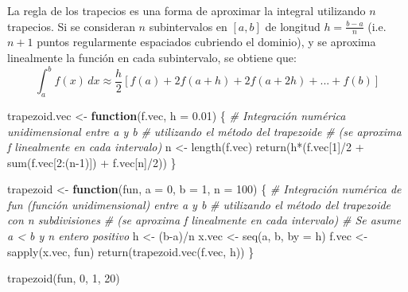 \documentclass[
]{book}
\newenvironment{Shaded}{\begin{snugshade}}{\end{snugshade}}
\newcommand{\AttributeTok}[1]{\textcolor[rgb]{0.77,0.63,0.00}{#1}}
\newcommand{\CommentTok}[1]{\textcolor[rgb]{0.56,0.35,0.01}{\textit{#1}}}
\newcommand{\ControlFlowTok}[1]{\textcolor[rgb]{0.13,0.29,0.53}{\textbf{#1}}}
\newcommand{\DecValTok}[1]{\textcolor[rgb]{0.00,0.00,0.81}{#1}}
\newcommand{\FloatTok}[1]{\textcolor[rgb]{0.00,0.00,0.81}{#1}}
\newcommand{\FunctionTok}[1]{\textcolor[rgb]{0.00,0.00,0.00}{#1}}
\newcommand{\NormalTok}[1]{#1}
\newcommand{\OtherTok}[1]{\textcolor[rgb]{0.56,0.35,0.01}{#1}}
\newcommand{\SpecialCharTok}[1]{\textcolor[rgb]{0.00,0.00,0.00}{#1}}
\theoremstyle{break}
\theoremstyle{nonumberplain}
\begin{document}
La regla de los trapecios es una forma de aproximar la integral utilizando \(n\) trapecios.
Si se consideran \(n\) subintervalos en \([a,b]\) de longitud \(h= \frac{b-a}{n}\)
(i.e.~\(n + 1\) puntos regularmente espaciados cubriendo el dominio), y
se aproxima linealmente la función en cada subintervalo, se obtiene que:
\[\int_a^b f(x)\, dx \approx \frac{h}{2} [f(a)+2f(a+h)+2f(a+2h)+...+f(b)]\]

\begin{Shaded}
\begin{Highlighting}[]
\NormalTok{trapezoid.vec }\OtherTok{\textless{}{-}} \ControlFlowTok{function}\NormalTok{(f.vec, }\AttributeTok{h =} \FloatTok{0.01}\NormalTok{) \{}
\CommentTok{\# Integración numérica unidimensional entre a y b}
\CommentTok{\# utilizando el método del trapezoide }
\CommentTok{\# (se aproxima f linealmente en cada intervalo)}
\NormalTok{  n }\OtherTok{\textless{}{-}} \FunctionTok{length}\NormalTok{(f.vec) }
  \FunctionTok{return}\NormalTok{(h}\SpecialCharTok{*}\NormalTok{(f.vec[}\DecValTok{1}\NormalTok{]}\SpecialCharTok{/}\DecValTok{2} \SpecialCharTok{+} \FunctionTok{sum}\NormalTok{(f.vec[}\DecValTok{2}\SpecialCharTok{:}\NormalTok{(n}\DecValTok{{-}1}\NormalTok{)]) }\SpecialCharTok{+}\NormalTok{ f.vec[n]}\SpecialCharTok{/}\DecValTok{2}\NormalTok{))}
\NormalTok{\}}

\NormalTok{trapezoid }\OtherTok{\textless{}{-}} \ControlFlowTok{function}\NormalTok{(fun, }\AttributeTok{a =} \DecValTok{0}\NormalTok{, }\AttributeTok{b =} \DecValTok{1}\NormalTok{, }\AttributeTok{n =} \DecValTok{100}\NormalTok{) \{}
\CommentTok{\# Integración numérica de fun (función unidimensional) entre a y b}
\CommentTok{\# utilizando el método del trapezoide con n subdivisiones}
\CommentTok{\# (se aproxima f linealmente en cada intervalo)}
\CommentTok{\# Se asume a \textless{} b y n entero positivo }
\NormalTok{  h }\OtherTok{\textless{}{-}}\NormalTok{ (b}\SpecialCharTok{{-}}\NormalTok{a)}\SpecialCharTok{/}\NormalTok{n}
\NormalTok{  x.vec }\OtherTok{\textless{}{-}} \FunctionTok{seq}\NormalTok{(a, b, }\AttributeTok{by =}\NormalTok{ h)}
\NormalTok{  f.vec }\OtherTok{\textless{}{-}} \FunctionTok{sapply}\NormalTok{(x.vec, fun)}
  \FunctionTok{return}\NormalTok{(}\FunctionTok{trapezoid.vec}\NormalTok{(f.vec, h))}
\NormalTok{\}}

\FunctionTok{trapezoid}\NormalTok{(fun, }\DecValTok{0}\NormalTok{, }\DecValTok{1}\NormalTok{, }\DecValTok{20}\NormalTok{)}
\end{Highlighting}
\end{Shaded}
\end{document}
